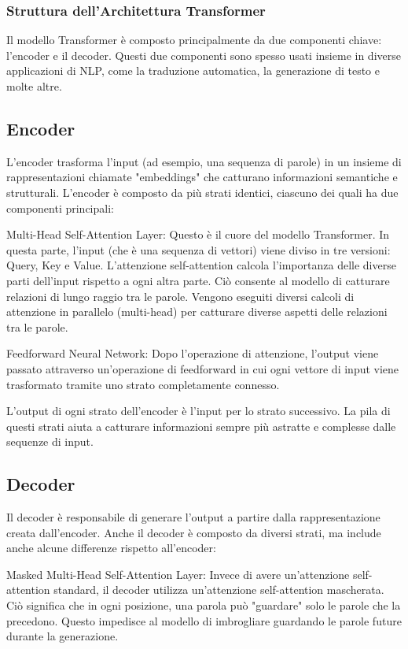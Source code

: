 \subsubsection{Struttura dell'Architettura Transformer}

Il modello Transformer è composto principalmente da due componenti chiave: l'encoder e il decoder. Questi due componenti sono spesso usati insieme in diverse applicazioni di NLP, come la traduzione automatica, la generazione di testo e molte altre.

\subsection{Encoder}
L'encoder trasforma l'input (ad esempio, una sequenza di parole) in un insieme di rappresentazioni chiamate "embeddings" che catturano informazioni semantiche e strutturali. L'encoder è composto da più strati identici, ciascuno dei quali ha due componenti principali:

Multi-Head Self-Attention Layer: Questo è il cuore del modello Transformer. In questa parte, l'input (che è una sequenza di vettori) viene diviso in tre versioni: Query, Key e Value. L'attenzione self-attention calcola l'importanza delle diverse parti dell'input rispetto a ogni altra parte. Ciò consente al modello di catturare relazioni di lungo raggio tra le parole. Vengono eseguiti diversi calcoli di attenzione in parallelo (multi-head) per catturare diverse aspetti delle relazioni tra le parole.

Feedforward Neural Network: Dopo l'operazione di attenzione, l'output viene passato attraverso un'operazione di feedforward in cui ogni vettore di input viene trasformato tramite uno strato completamente connesso.

L'output di ogni strato dell'encoder è l'input per lo strato successivo. La pila di questi strati aiuta a catturare informazioni sempre più astratte e complesse dalle sequenze di input.

\subsection{Decoder}
Il decoder è responsabile di generare l'output a partire dalla rappresentazione creata dall'encoder. Anche il decoder è composto da diversi strati, ma include anche alcune differenze rispetto all'encoder:

Masked Multi-Head Self-Attention Layer: Invece di avere un'attenzione self-attention standard, il decoder utilizza un'attenzione self-attention mascherata. Ciò significa che in ogni posizione, una parola può "guardare" solo le parole che la precedono. Questo impedisce al modello di imbrogliare guardando le parole future durante la generazione.

